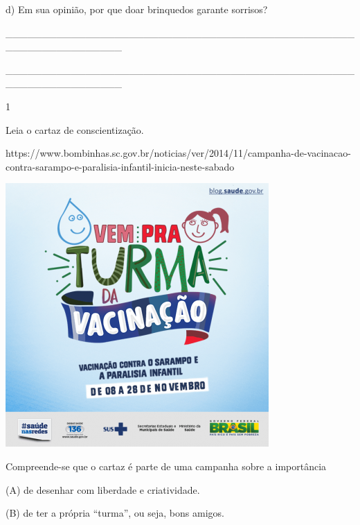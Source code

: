 \begin{boxlist}
{d) Em sua opinião, por que doar brinquedos garante sorrisos?


\_\_\_\_\_\_\_\_\_\_\_\_\_\_\_\_\_\_\_\_\_\_\_\_\_\_\_\_\_\_\_\_\_\_\_\_\_\_\_\_\_\_\_\_\_\_\_\_\_\_\_\_\_\_\_\_\_\_\_\_\_\_\_\_

\_\_\_\_\_\_\_\_\_\_\_\_\_\_\_\_\_\_\_\_\_\_\_\_\_\_\_\_\_\_\_\_\_\_\_\_\_\_\_\_\_\_\_\_\_\_\_\_\_\_\_\_\_\_\_\_\_\_\_\_\_\_\_\_


\num{1}

Leia o cartaz de conscientização.

https://www.bombinhas.sc.gov.br/noticias/ver/2014/11/campanha-de-vacinacao-contra-sarampo-e-paralisia-infantil-inicia-neste-sabado

\includegraphics[width=3.95833in,height=3.95833in]{media/image12.png}


Compreende-se que o cartaz é parte de uma campanha sobre a importância

(A) de desenhar com liberdade e criatividade.

(B) de ter a própria ``turma'', ou seja, bons amigos.

}
\end{boxlist}
